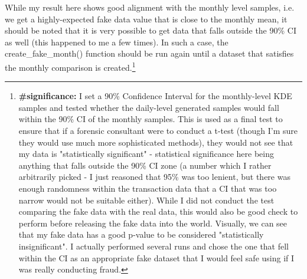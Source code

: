 \documentclass[11pt]{article}
\begin{document}
While my result here shows good alignment with the monthly level
samples, i.e. we get a highly-expected fake data value that is close to
the monthly mean, it should be noted that it is very possible to get
data that falls outside the 90\% CI as well (this happened to me a few
times). In such a case, the create\_fake\_month() function should be run
again until a dataset that satisfies the monthly comparison is created.\footnote{\textbf{\#significance: } I set a 90\% Confidence Interval for the monthly-level KDE samples and tested whether the daily-level generated samples would fall within the 90\% CI of the monthly samples. This is used as a final test to ensure that if a forensic consultant were to conduct a t-test (though I'm sure they would use much more sophisticated methods), they would not see that my data is "statistically significant" - statistical significance here being anything that falls outside the 90\% CI zone (a number which I rather arbitrarily picked - I just reasoned that 95\% was too lenient, but there was enough randomness within the transaction data that a CI that was too narrow would not be suitable either). While I did not conduct the test comparing the fake data with the real data, this would also be good check to perform before releasing the fake data into the world. Visually, we can see that my fake data has a good p-value to be considered "statistically insignificant". I actually performed several runs and chose the one that fell within the CI as an appropriate fake dataset that I would feel safe using if I was really conducting fraud.}
\end{document}
